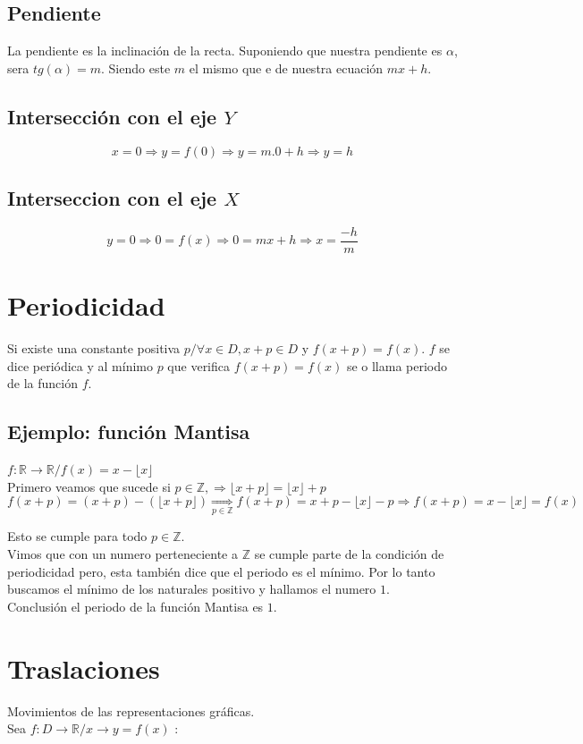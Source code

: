 \subsection{Pendiente}
La pendiente es la inclinación de la recta. Suponiendo que nuestra pendiente es $\alpha$, sera $tg(\alpha)= m$. Siendo este $m$ el mismo que e de nuestra ecuación $mx+h$.
\subsection{Intersección con el eje $Y$}
$$x=0 \Rightarrow y=f(0) \Rightarrow y=m.0+h \Rightarrow y=h$$
\subsection{Interseccion con el eje $X$}
$$y=0 \Rightarrow 0=f(x) \Rightarrow 0=mx+h \Rightarrow x=\dfrac{-h}{m}$$
\section{Periodicidad}
Si existe una constante positiva $p / \forall x \in D, x+p \in D$ y $f(x+p)=f(x)$. $f$ se dice periódica y al mínimo $p$ que verifica $f(x+p)=f(x)$ se o llama periodo de la función $f$.
\subsection{Ejemplo: función Mantisa}
$f: \mathbb{R} \longrightarrow \mathbb{R}/f(x)= x-\lfloor x \rfloor$\\

Primero veamos que sucede si $p \in \mathbb{Z}, \Rightarrow \lfloor x+p \rfloor = \lfloor x \rfloor +p$
$$f(x+p) = (x+p)-(\lfloor x+p \rfloor) \underset{p \in \mathbb{Z}}{\Rightarrow} f(x+p) = x+p-\lfloor x \rfloor - p
\Rightarrow f(x+p) = x-\lfloor x \rfloor = f(x)$$

Esto se cumple para todo $p \in \mathbb{Z}$.\\

Vimos que con un numero perteneciente a $\mathbb{Z}$ se cumple parte de la condición de periodicidad pero, esta también dice que el periodo es el mínimo. Por lo tanto buscamos el mínimo de los naturales positivo y hallamos el numero $1$.\\

Conclusión el periodo de la función Mantisa es $1$.
\section{Traslaciones}
Movimientos de las representaciones gráficas.\\
Sea $f:D \longrightarrow \mathbb{R} / x\longrightarrow y=f(x)$ :
